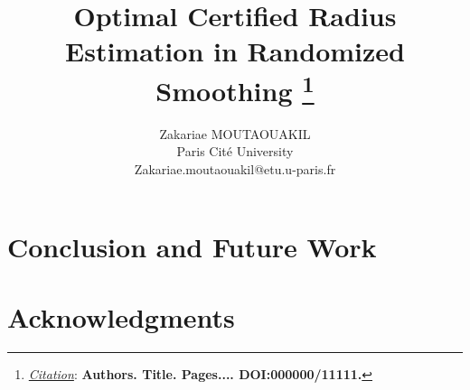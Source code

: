 \documentclass{article}
\title{Optimal Certified Radius Estimation in Randomized Smoothing
\thanks{\textit{\underline{Citation}}:
\textbf{Authors. Title. Pages.... DOI:000000/11111.}}
}
\author{
    Zakariae MOUTAOUAKIL\\
    Paris Cité University\\
    Zakariae.moutaouakil@etu.u-paris.fr\\
}
\begin{document}
    \maketitle


    \begin{abstract}
        \lipsum[1]
    \end{abstract}




    

    

    

    

    

%    


    \section{Conclusion and Future Work}
    \lipsum[2]

    \section*{Acknowledgments}
    \lipsum[3]

    \appendix

    

    

    
    
\end{document}
